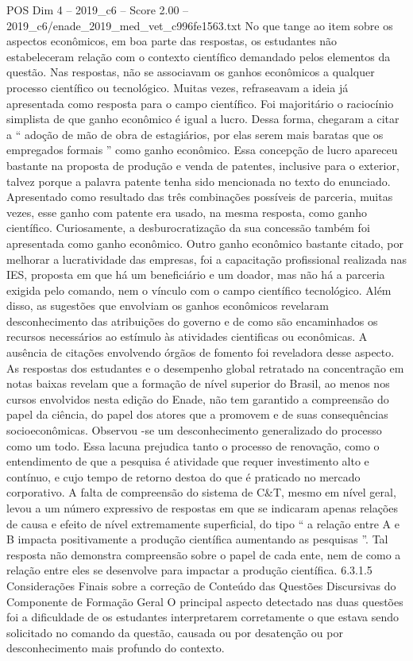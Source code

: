 \begin{textsample}{POS Dim 4 – 2019\_c6 – Score 2.00 – 2019\_c6/enade\_2019\_med\_vet\_c996fe1563.txt}
No que tange ao item sobre os aspectos econômicos, em boa parte das respostas, os estudantes não estabeleceram relação com o contexto científico demandado pelos elementos da questão.
Nas respostas, não se associavam os ganhos econômicos a qualquer processo científico ou tecnológico.
Muitas vezes, refraseavam a ideia já apresentada como resposta para o campo científico.
Foi majoritário o raciocínio simplista de que ganho econômico é igual a lucro.
Dessa forma, chegaram a citar a “ adoção de mão de obra de estagiários, por elas serem mais baratas que os empregados formais ” como ganho econômico.
Essa concepção de lucro apareceu bastante na proposta de produção e venda de patentes, inclusive para o exterior, talvez porque a palavra patente tenha sido mencionada no texto do enunciado.
Apresentado como resultado das três combinações possíveis de parceria, muitas vezes, esse ganho com patente era usado, na mesma resposta, como ganho científico.
Curiosamente, a desburocratização da sua concessão também foi apresentada como ganho econômico.
Outro ganho econômico bastante citado, por melhorar a lucratividade das empresas, foi a capacitação profissional realizada nas IES, proposta em que há um beneficiário e um doador, mas não há a parceria exigida pelo comando, nem o vínculo com o campo científico tecnológico.
Além disso, as sugestões que envolviam os ganhos econômicos revelaram desconhecimento das atribuições do governo e de como são encaminhados os recursos necessários ao estímulo às atividades cientificas ou econômicas.
A ausência de citações envolvendo órgãos de fomento foi reveladora desse aspecto.
As respostas dos estudantes e o desempenho global retratado na concentração em notas baixas revelam que a formação de nível superior do Brasil, ao menos nos cursos envolvidos nesta edição do Enade, não tem garantido a compreensão do papel da ciência, do papel dos atores que a promovem e de suas consequências socioeconômicas.
Observou -se um desconhecimento generalizado do processo como um todo.
Essa lacuna prejudica tanto o processo de renovação, como o entendimento de que a pesquisa é atividade que requer investimento alto e contínuo, e cujo tempo de retorno destoa do que é praticado no mercado corporativo.
A falta de compreensão do sistema de C\&T, mesmo em nível geral, levou a um número expressivo de respostas em que se indicaram apenas relações de causa e efeito de nível extremamente superficial, do tipo “ a relação entre A e B impacta positivamente a produção científica aumentando as pesquisas ”.
Tal resposta não demonstra compreensão sobre o papel de cada ente, nem de como a relação entre eles se desenvolve para impactar a produção científica. 6.3.1.5 Considerações Finais sobre a correção de Conteúdo das Questões Discursivas do Componente de Formação Geral O principal aspecto detectado nas duas questões foi a dificuldade de os estudantes interpretarem corretamente o que estava sendo solicitado no comando da questão, causada ou por desatenção ou por desconhecimento mais profundo do contexto.

\end{textsample}
